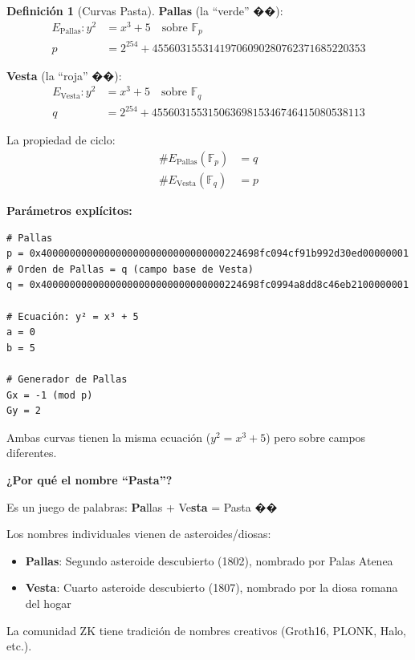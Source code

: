 \documentclass[11pt,a4paper,twoside,openright]{book}
\theoremstyle{definition}
\newtheorem{definition}{Definición}[chapter]
\theoremstyle{plain}
\theoremstyle{remark}
\begin{document}
\begin{definition}[Curvas Pasta]
\textbf{Pallas} (la ``verde'' ��):
\begin{align}
E_{\text{Pallas}}: y^2 &= x^3 + 5 \quad \text{sobre } \mathbb{F}_p \\
p &= 2^{254} + 45560315531419706090280762371685220353
\end{align}

\textbf{Vesta} (la ``roja'' ��):
\begin{align}
E_{\text{Vesta}}: y^2 &= x^3 + 5 \quad \text{sobre } \mathbb{F}_q \\
q &= 2^{254} + 45560315531506369815346746415080538113
\end{align}

La propiedad de ciclo:
\begin{align}
\#E_{\text{Pallas}}(\mathbb{F}_p) &= q \\
\#E_{\text{Vesta}}(\mathbb{F}_q) &= p
\end{align}
\end{definition}

\begin{mathnote}
\textbf{Parámetros explícitos:}

\begin{verbatim}
# Pallas
p = 0x40000000000000000000000000000000224698fc094cf91b992d30ed00000001
# Orden de Pallas = q (campo base de Vesta)
q = 0x40000000000000000000000000000000224698fc0994a8dd8c46eb2100000001

# Ecuación: y² = x³ + 5
a = 0
b = 5

# Generador de Pallas
Gx = -1 (mod p)
Gy = 2
\end{verbatim}

Ambas curvas tienen la misma ecuación ($y^2 = x^3 + 5$) pero sobre campos diferentes.
\end{mathnote}

\begin{intuicion}
\textbf{¿Por qué el nombre ``Pasta''?}

Es un juego de palabras: \textbf{Pa}llas + Ve\textbf{sta} = Pasta ��

Los nombres individuales vienen de asteroides/diosas:
\begin{itemize}
    \item \textbf{Pallas}: Segundo asteroide descubierto (1802), nombrado por Palas Atenea
    \item \textbf{Vesta}: Cuarto asteroide descubierto (1807), nombrado por la diosa romana del hogar
\end{itemize}

La comunidad ZK tiene tradición de nombres creativos (Groth16, PLONK, Halo, etc.).
\end{intuicion}
\end{document}

